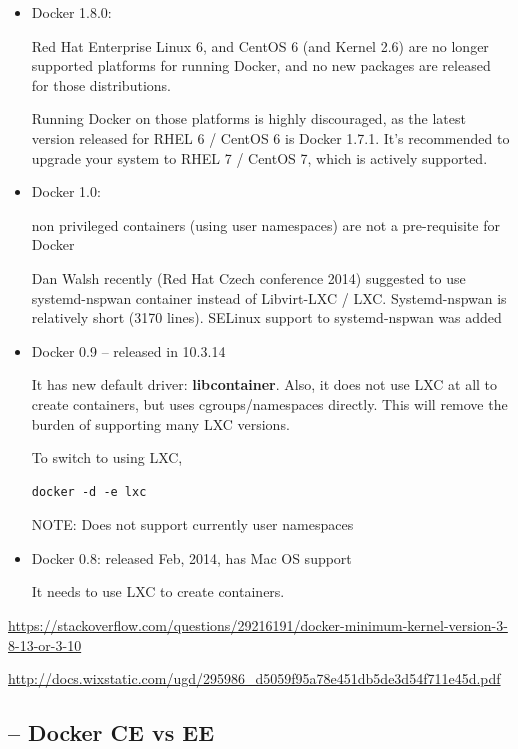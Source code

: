 \begin{itemize}
  
  \item Docker 1.8.0:
  
   Red Hat Enterprise Linux 6, and CentOS 6 (and Kernel 2.6) are no longer
   supported platforms for running Docker, and no new packages are released for
   those distributions. 
   
   Running Docker on those platforms is highly discouraged, as the latest
   version released for RHEL 6 / CentOS 6 is Docker 1.7.1. It's recommended to
   upgrade your system to RHEL 7 / CentOS 7, which is actively supported.
  
  
  \item Docker 1.0: 
  
  non privileged containers (using user namespaces) are not a pre-requisite for Docker
  
  Dan Walsh recently (Red Hat Czech conference 2014) suggested to use
  systemd-nspwan container instead of Libvirt-LXC / LXC.
  Systemd-nspwan is relatively short (3170 lines). SELinux support to systemd-nspwan was added
  
  \item Docker 0.9 – released in 10.3.14
  
  It has new default driver: {\bf libcontainer}. Also, it does not use LXC at
  all to create containers, but uses cgroups/namespaces directly. 
  This will remove the burden of supporting many LXC versions.
  
  
  To switch to using LXC,
\begin{verbatim}
docker -d -e lxc
\end{verbatim}
  
  NOTE: Does not support currently user namespaces
   
  
  \item  Docker 0.8: released Feb, 2014, has Mac OS support
  
  It needs to use LXC to create containers. 
\end{itemize}


\url{https://stackoverflow.com/questions/29216191/docker-minimum-kernel-version-3-8-13-or-3-10}


\url{http://docs.wixstatic.com/ugd/295986_d5059f95a78e451db5de3d54f711e45d.pdf}


\subsection{-- Docker CE vs EE}
\label{sec:Docker-types}

